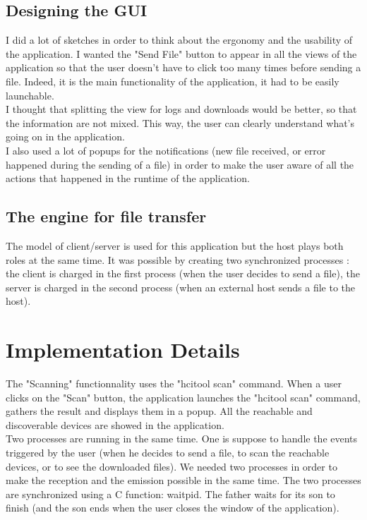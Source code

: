 \documentclass[a4paper, 12pt, final]{article}
\begin{document}
\subsection{Designing the GUI}
I did a lot of sketches in order to think about the ergonomy and the usability of the application. I wanted the "Send File" button to appear in all the views of the application so that the user doesn't have to click too many times before sending a file. Indeed, it is the main functionality of the application, it had to be easily launchable. \\
I thought that splitting the view for logs and downloads would be better, so that the information are not mixed. This way, the user can clearly understand what's going on in the application. \\
I also used a lot of popups for the notifications (new file received, or error happened during the sending of a file) in order to make the user aware of all the actions that happened in the runtime of the application.

\subsection{The engine for file transfer}
The model of client/server is used for this application but the host plays both roles at the same time. It was possible by creating two synchronized processes : the client is charged in the first process (when the user decides to send a file), the server is charged in the second process (when an external host sends a file to the host). 



\section{Implementation Details} 

The "Scanning" functionnality uses the "hcitool scan" command. When a user clicks on the "Scan" button, the application launches the "hcitool scan" command, gathers the result and displays them in a popup. All the reachable and discoverable devices are showed in the application.\\ 
Two processes are running in the same time. One is suppose to handle the events triggered by the user (when he decides to send a file, to scan the reachable devices, or to see the downloaded files). We needed two processes in order to make the reception and the emission possible in the same time. The two processes are synchronized using a C function: waitpid. The father waits for its son to finish (and the son ends when the user closes the window of the application). 
\end{document}
